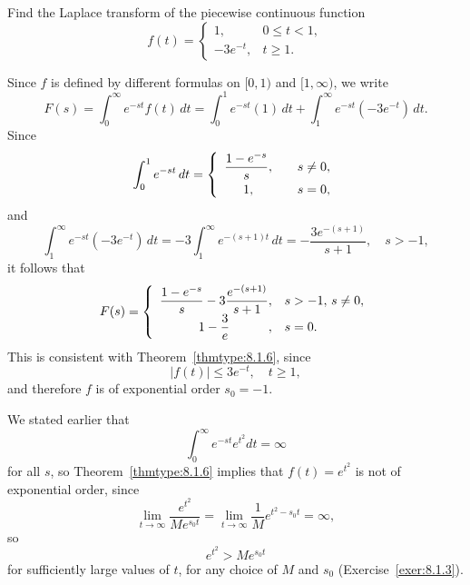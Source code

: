 \begin{example}
  \label{example:8.1.10}\rm Find the Laplace transform of the piecewise continuous function
  \[
    f(t)=\left\{
    \begin{array}{cl}
      1,        & 0\le t<1, \\
      -3e^{-t}, & t\ge 1.
    \end{array}\right.
  \]
\end{example}

\begin{examplesolution}
\solution Since $f$ is defined by different formulas on $[0,1)$ and $[1,\infty)$, we write
\[
  F(s)=\int_{0}^{\infty}e^{-st}f(t)\,dt =\int_{0}^{1}e^{-st}(1)\,dt+\int_{1}^{\infty}e^{-st}(-3e^{-t})\,dt.
\]
Since
\[
  \int_{0}^{1}e^{-st}\,dt=\left\{
  \begin{array}{cl}
    \displaystyle{\frac{1-e^{-s}}{s}}, & \quad s\ne0, \\[2\jot]
    1,                        & \quad s=0,
  \end{array}\right.
\]
and
\[
  \int_{1}^{\infty}e^{-st}(-3e^{-t})\,dt=-3\int_{1}^{\infty}e^{-(s+1)t}\,dt=-\frac{3e^{-(s+1)}}{s+1},\quad s>-1,
\]
it follows that
\[
  F(s)=\left\{
  \begin{array}{rl}
    \dst{\frac{1-e^{-s}}{s}-3{\frac{e^{-(s+1)}}{s+1}}}, & s>-1,\,s\ne0, \\
    \hfill\dst{1-\frac{3}{e}}\hfill,                    & s=0.
  \end{array}\right.
\]
This is consistent with Theorem~\ref{thmtype:8.1.6}, since
\[
  |f(t)|\le3e^{-t},\quad t\ge1,
\]
and therefore $f$ is of exponential order $s_{0}=-1$.
\end{examplesolution}

\color{blue}
\color{black}

\begin{example}
  \label{example:8.1.11}\rm We stated earlier that
  \[
    \int_{0}^{\infty}e^{-st}e^{t^{2}}dt=\infty
  \]
  for all $s$, so Theorem~\ref{thmtype:8.1.6} implies that $f(t)=e^{t^{2}}$ is not of exponential
  order, since
  \[
    \lim_{t\to\infty}\frac{e^{t^{2}}}{Me^{s_{0}t}}=\lim_{t\to\infty}\frac{1}{M}e^{t^{2}-s_{0}t}=\infty,
  \]
  so
  \[
    e^{t^{2}}>Me^{s_{0}t}
  \]
  for sufficiently large values of $t$, for any choice of $M$ and $s_{0}$
  (Exercise~\ref{exer:8.1.3}).
\end{example}


